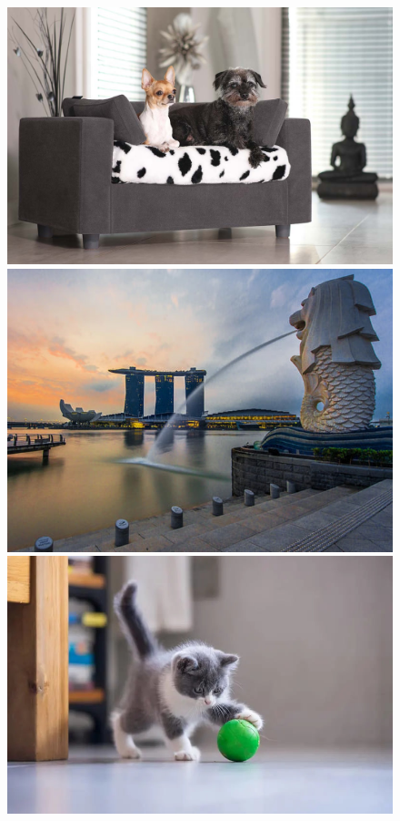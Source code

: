 \begin{figure}[H]
\centering
\begin{minipage}{0.3\textwidth}%
 \includegraphics[width=\textwidth]{Graphics/Images/image_4.jpg}
 \caption{ }
 \label{fig:4}
\end{minipage}%
\begin{minipage}{0.3\textwidth}
 \includegraphics[width=\textwidth]{Graphics/Images/image_5.jpg}
 \caption{ }
 \label{fig:5}
\end{minipage}
\begin{minipage}{0.3\textwidth}
 \includegraphics[width=\textwidth]{Graphics/Images/image_6.jpg}

\end{minipage}
\end{figure}
